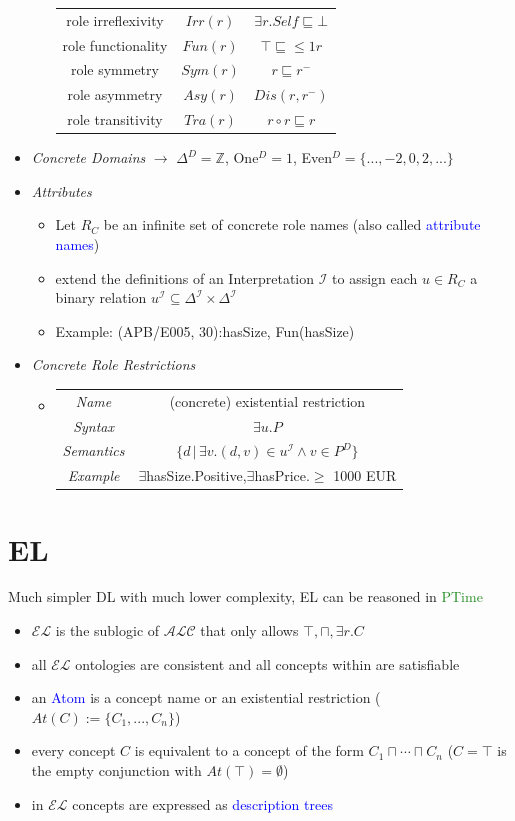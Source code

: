 \documentclass[12pt,a4paper]{article}
\newcommand{\blue}[1]{\textcolor{blue} {#1}}
\newcommand{\green}[1]{\textcolor{ForestGreen} {#1}}
\newcommand{\ip}{^\mathcal{I}}
\newcommand{\sse}{\sqsubseteq}
\newcommand{\sand}{\sqcap}
\begin{document}
\begin{itemize}
\begin{itemize}
\begin{tabular}{c c c}
role irreflexivity & $Irr(r)$ & $\exists r.Self \sse \bot$\\
role functionality & $Fun(r)$ & $\top \sse \leq 1 r$\\
role symmetry & $Sym(r)$ & $r\sse r^-$\\
role asymmetry & $Asy(r)$ & $Dis(r,r^-)$\\
role transitivity & $Tra(r)$ & $r\circ r\sse r$
\end{tabular}
\end{itemize}
\item \textit{Concrete Domains} $\rightarrow$ $\Delta^D = \mathbb{Z}$, One$^D = 1$, Even$^D = \{...,-2,0,2,...\}$
\item \textit{Attributes}
\begin{itemize}
\item Let $R_C$ be an infinite set of concrete role names (also called \blue{attribute names})
\item extend the definitions of an Interpretation $\mathcal{I}$ to assign each $u\in R_C$ a binary relation $u\ip \subseteq \Delta\ip \times \Delta\ip$
\item Example: (APB/E005, 30):hasSize, Fun(hasSize)
\end{itemize}
\item \textit{Concrete Role Restrictions}
\begin{itemize}
\item \begin{tabular}{c c}
\textit{Name} & (concrete) existential restriction\\
\textit{Syntax} & $\exists u.P$ \\
\textit{Semantics} & $\{d\,|\, \exists v.(d,v)\in u\ip \land v \in P^D\}$\\
\textit{Example} & $\exists$hasSize.Positive,\quad $\exists$hasPrice.$\geq$ 1000 EUR
\end{tabular}
\end{itemize}
\end{itemize}
\section{EL}
Much simpler DL with much lower complexity, EL can be reasoned in \green{PTime}
\begin{itemize}
\item $\mathcal{EL}$ is the sublogic of $\mathcal{ALC}$ that only allows $\top,\sand,\exists r.C$
\item all $\mathcal{EL}$ ontologies are consistent and all concepts within are satisfiable
\item an \blue{Atom} is a concept name or an existential restriction ($At(C) := \{C_1,...,C_n\}$)
\item every concept $C$ is equivalent to a concept of the form $C_1 \sand \cdots \sand C_n$ ($C=\top$ is the empty conjunction with $At(\top) = \emptyset$)
\item in $\mathcal{EL}$ concepts are expressed as \blue{description trees}
\end{itemize}
\end{document}
